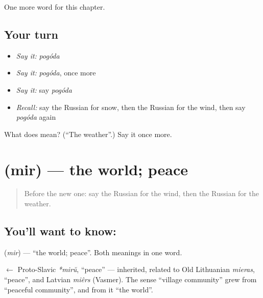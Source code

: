 \begin{grammarlens}[title={What you've built}]
One more word for this chapter.
\end{grammarlens}

\subsection*{Your turn}
\begin{itemize}
\raggedright
  \item \emph{Say it:} \emph{pogóda}
  \item \emph{Say it:} \emph{pogóda}, once more
  \item \emph{Say it:} say \emph{pogóda}
  \item \emph{Recall:} say the Russian for snow, then the Russian for the wind, then say \emph{pogóda} again
\end{itemize}

\begin{tcolorbox}[breakable,colback=teal!4,colframe=teal!35!black,title={Before you move on}]
What does  mean? (\textquotedblleft{}The weather\textquotedblright{}.) Say it once more.
\end{tcolorbox}
\section[\texorpdfstring{\ru{мир} (mir)}{мир (mir)}]{ (mir) — the world; peace}

\label{lesson:RU-C59-world}



\begin{quote}
Before the new one: say the Russian for the wind, then the Russian for the weather.
\end{quote}

\subsection*{You'll want to know: }
\textbf{} (\emph{mir}) — \textquotedblleft{}the world; peace\textquotedblright{}. Both meanings in one word.

\begin{cousinweb}
\textbf{} $\leftarrow$ Proto-Slavic \emph{*mirŭ}, \textquotedblleft{}peace\textquotedblright{} — inherited, related to Old Lithuanian \emph{mieras}, \textquotedblleft{}peace\textquotedblright{}, and Latvian \emph{miêrs} (Vasmer). The sense \textquotedblleft{}village community\textquotedblright{} grew from \textquotedblleft{}peaceful community\textquotedblright{}, and from it \textquotedblleft{}the world\textquotedblright{}.
\end{cousinweb}

